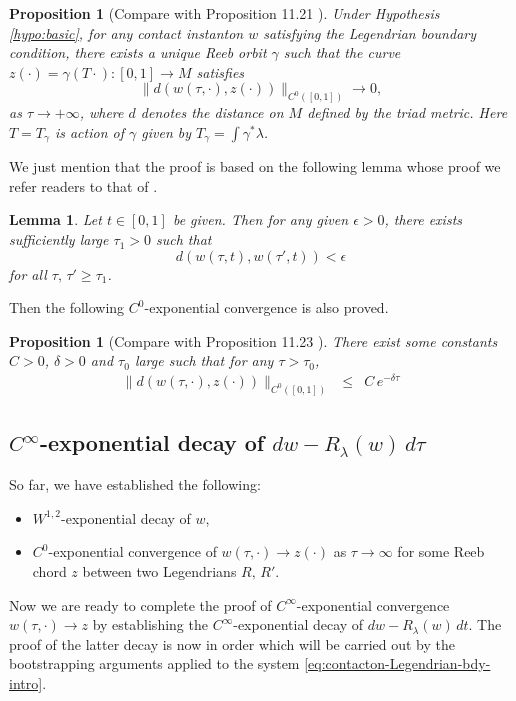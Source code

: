 \documentclass[reqno]{amsart}
\newcommand{\beastar}{\begin{eqnarray*}}
\newcommand{\eeastar}{\end{eqnarray*}}
\theoremstyle{theorem}
\newtheorem{lem}[thm]{Lemma}
\newtheorem{prop}[thm]{Proposition}
\theoremstyle{definition}
\numberwithin{equation}{section}
\begin{document}
\begin{prop}[Compare with Proposition 11.21 \cite{oh-wang:CR-map2}]\label{prop:czero-convergence}
Under Hypothesis \ref{hypo:basic}, for any contact instanton $w$ satisfying the Legendrian boundary condition, there exists a unique Reeb orbit $\gamma$ such that the curve  $z(\cdot)=\gamma(T\cdot):[0,1] \to M$  satisfies
$$
\|d(w(\tau, \cdot), z(\cdot))
\|_{C^0([0,1])}\rightarrow 0,
$$
as $\tau\rightarrow +\infty$,
where $d$ denotes the distance on $M$ defined by the triad metric.
Here $T = T_\gamma $ is action of $\gamma$ given by  $T_\gamma =\int \gamma^*\lambda$.
\end{prop}

We just mention that the proof is based on the following lemma whose proof we
refer readers to that of \cite[Lemma 11.22]{oh-wang:CR-map2}.
\begin{lem} Let $t \in [0,1]$ be given. Then
for any given $\epsilon > 0$, there exists sufficiently large $\tau_1 > 0$ such that
$$
d(w(\tau,t), w(\tau', t)) < \epsilon
$$
for all $\tau, \, \tau' \geq \tau_1$.
\end{lem}

Then the following $C^0$-exponential convergence is also proved.
\begin{prop}[Compare with Proposition 11.23 \cite{oh-wang:CR-map2}]
There exist some constants $C>0$, $\delta>0$ and $\tau_0$ large such that for any $\tau>\tau_0$,
\beastar
\|d\left( w(\tau, \cdot), z(\cdot) \right) \|_{C^0([0,1])} &\leq& C\, e^{-\delta \tau}
\eeastar
\end{prop}

\subsection{$C^\infty$-exponential decay of $dw - R_\lambda(w) \, d\tau$}
\label{subsec:Cinftydecaydu}

 So far, we have established the following:
\begin{itemize}
\item $W^{1,2}$-exponential decay of $w$,
\item $C^0$-exponential convergence of $w(\tau,\cdot) \to z(\cdot)$ as $\tau \to \infty$
for some Reeb chord $z$ between two Legendrians $R, \, R'$.
\end{itemize}

Now we are ready to complete the proof of
$C^\infty$-exponential convergence $w(\tau,\cdot) \to z$
by establishing the $C^\infty$-exponential decay of $dw - R_\lambda(w)\, dt$.
The proof of the latter decay is now in order which will be
carried out by the bootstrapping arguments
applied to the system \eqref{eq:contacton-Legendrian-bdy-intro}.
\end{document}
